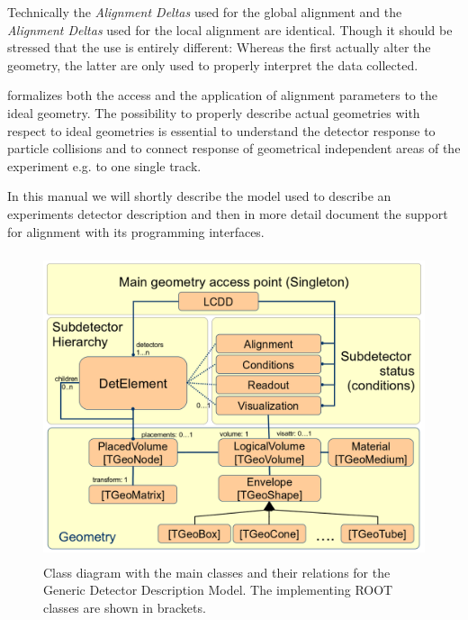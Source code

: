 \documentclass[10pt,a4paper]{article}
\begin{document}
\noindent
Technically the {\it{Alignment Deltas}} used for the global alignment 
and the {\it{Alignment Deltas}} used for the local alignment are identical.
Though it should be stressed that the use is entirely different:
Whereas the first actually alter the geometry, the latter are only used 
to properly interpret the data collected.

\noindent
\DDA formalizes both the access and the application of alignment parameters 
to the ideal geometry. The possibility to properly describe actual geometries 
with respect to ideal geometries is essential to understand the detector response
to particle collisions and to connect response of geometrical independent
areas of the experiment e.g. to one single track.

\noindent
In this manual we will shortly describe the model used
to describe an experiments detector description and then in more detail 
document the support for alignment with its programming interfaces.

\begin{figure}[h]
  \begin{center}
    \includegraphics[height=90mm] {DD4hep_classes}
    \caption{Class diagram with the main classes and their relations 
             for the Generic Detector Description Model. The implementing
             ROOT classes are shown in brackets.}
    \label{fig:dd4hep-detector-model}
  \end{center}
\end{figure}
\vspace{-0.1cm}
\end{document}
